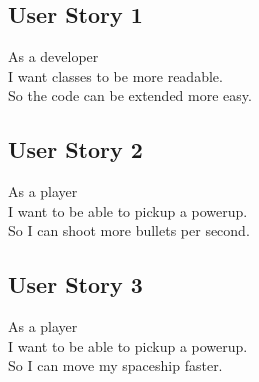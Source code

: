 \documentclass[10pt]{article}
\begin{document}
\subsection*{User Story 1}
As a developer\\ 
\indent I want classes to be more readable.\\
So the code can be extended more easy.

\subsection*{User Story 2}
As a player\\ 
\indent I want to be able to pickup a powerup.\\
So I can shoot more bullets per second.

\subsection*{User Story 3}
As a player\\ 
\indent I want to be able to pickup a powerup.\\
So I can move my spaceship faster.
\end{document}
